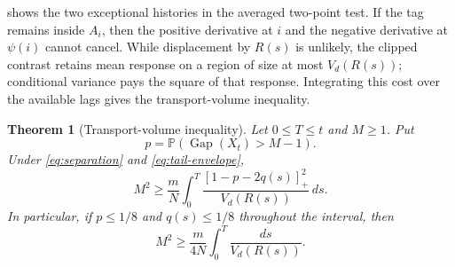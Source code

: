 \documentclass[11pt]{article}
\newtheorem{theorem}{Theorem}[section]
\theoremstyle{remark}
\newcommand{\Pp}{\mathbb{P}}
\newcommand{\Gap}{\operatorname{Gap}}
\begin{document}
 shows the two exceptional histories in the averaged two-point test. If the tag remains inside $A_i$, then the positive derivative at $i$ and the negative derivative at $\psi(i)$ cannot cancel. While displacement by $R(s)$ is unlikely, the clipped contrast retains mean response on a region of size at most $V_d(R(s))$; conditional variance pays the square of that response. Integrating this cost over the available lags gives the transport-volume inequality.

\begin{theorem}[Transport-volume inequality]\label{thm:transport-volume}
Let $0\le T\le t$ and $M\ge1$. Put
\[
 p=\Pp(\Gap(X_t)>M-1).
\]
Under \eqref{eq:separation} and \eqref{eq:tail-envelope},
\[
 \boxed{
 M^2\ge\frac mN\int_0^T
 \frac{[1-p-2q(s)]_+^2}{V_d(R(s))}\,ds.}
 \tag{5.4}\label{eq:transport-volume}
\]
In particular, if $p\le1/8$ and $q(s)\le1/8$ throughout the interval, then
\[
 M^2\ge\frac m{4N}\int_0^T\frac{ds}{V_d(R(s))}.
 \tag{5.5}\label{eq:transport-volume-simple}
\]
\end{theorem}
\end{document}
